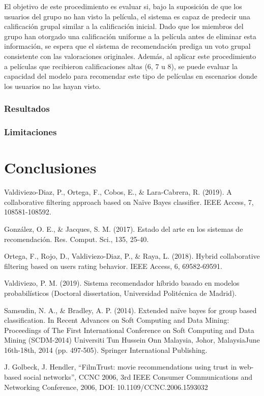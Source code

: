 \documentclass[twocolumn, fontsize=10pt]{article}
\begin{document}
El objetivo de este procedimiento es evaluar si, bajo la suposición de que los usuarios del grupo no han visto la película, el sistema es capaz de predecir una calificación grupal similar a la calificación inicial. Dado que los miembros del grupo han otorgado una calificación uniforme a la película antes de eliminar esta información, se espera que el sistema de recomendación prediga un voto grupal consistente con las valoraciones originales. Además, al aplicar este procedimiento a películas que recibieron calificaciones altas (6, 7 u 8), se puede evaluar la capacidad del modelo para recomendar este tipo de películas en escenarios donde los usuarios no las hayan visto.

\subsubsection{Resultados}

\subsubsection{Limitaciones}

\section{Conclusiones}

\renewcommand\refname{Referencias}

\begin{thebibliography}{}

    Valdiviezo-Diaz, P., Ortega, F., Cobos, E., \& Lara-Cabrera, R. (2019). A collaborative filtering approach based on Naïve Bayes classifier. IEEE Access, 7, 108581-108592.
    
    González, O. E., \& Jacques, S. M. (2017). Estado del arte en los sistemas de recomendación. Res. Comput. Sci., 135, 25-40.
    
    Ortega, F., Rojo, D., Valdiviezo-Diaz, P., \& Raya, L. (2018). Hybrid collaborative filtering based on users rating behavior. IEEE Access, 6, 69582-69591.
    
    Valdiviezo, P. M. (2019). Sistema recomendador híbrido basado en modelos probabilísticos (Doctoral dissertation, Universidad Politécnica de Madrid).

    Samsudin, N. A., \& Bradley, A. P. (2014). Extended naïve bayes for group based classification. In Recent Advances on Soft Computing and Data Mining: Proceedings of The First International Conference on Soft Computing and Data Mining (SCDM-2014) Universiti Tun Hussein Onn Malaysia, Johor, MalaysiaJune 16th-18th, 2014 (pp. 497-505). Springer International Publishing.

    J. Golbeck, J. Hendler, “FilmTrust: movie recommendations using trust in web-based social networks”, CCNC 2006, 3rd IEEE Consumer Communications and Networking Conference, 2006, DOI: 10.1109/CCNC.2006.1593032 
    
\end{thebibliography}
    
    
\end{document}
